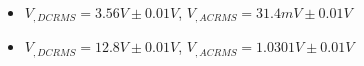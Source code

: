 \begin{itemize}
     \item $V_{, DCRMS}=3.56V\pm 0.01\unit{V}$, $V_{, ACRMS}=31.4mV\pm 0.01\unit{V}$ 
     \item $V_{, DCRMS}=12.8V\pm 0.01\unit{V}$, $V_{, ACRMS}=1.0301V\pm 0.01\unit{V}$\\
\end{itemize}